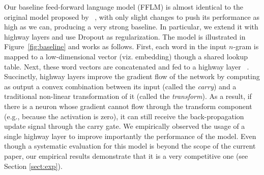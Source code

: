 Our baseline feed-forward language model (FFLM) is almost identical to the original model proposed by  ~, with only slight changes to push its performance as high as we can, producing a very strong baseline. In particular, we extend it with highway layers and use Dropout as regularization. The model is illustrated in Figure~\ref{fig:baseline} and works as follows. First, each word in the input $n$-gram is mapped to a low-dimensional vector (viz. embedding) though a shared lookup table. Next, these word vectors are concatenated and fed to a highway layer ~\cite{srivastava2015highway}.
Succinctly, highway layers improve the gradient flow of the network by computing as output a convex combination between its input (called the \emph{carry}) and a traditional non-linear transformation of it (called the \emph{transform}).
As a result, if there is a neuron whose gradient cannot flow through the transform component (e.g., because the activation is zero), it can still receive the back-propagation update signal through the carry gate.  %
 We empirically observed the usage of a single highway layer to improve importantly the performance of the model. Even though a systematic evaluation for this model is beyond the scope of the current paper, our empirical results demonstrate that it is a very competitive one (see Section \ref{sect:exp}).    

